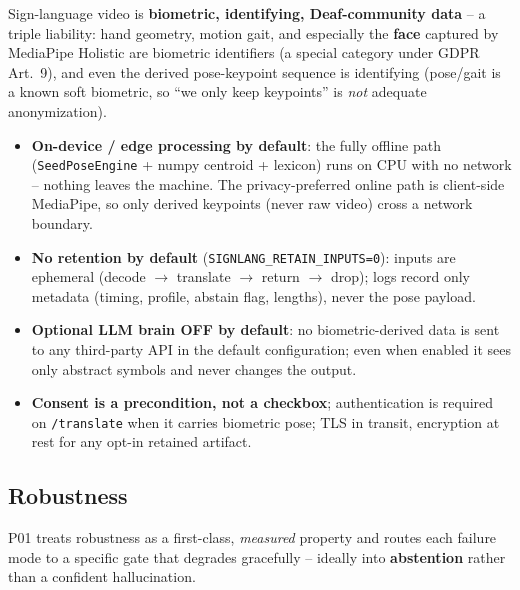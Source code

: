 \documentclass[12pt,a4paper]{article}
\begin{document}
Sign-language video is \textbf{biometric, identifying, Deaf-community data} -- a triple liability: hand geometry, motion gait, and especially the \textbf{face} captured by MediaPipe Holistic are biometric identifiers (a special category under GDPR Art.\ 9), and even the derived pose-keypoint sequence is identifying (pose/gait is a known soft biometric, so ``we only keep keypoints'' is \emph{not} adequate anonymization).
\begin{itemize}\setlength\itemsep{0.15em}
  \item \textbf{On-device / edge processing by default}: the fully offline path (\texttt{SeedPoseEngine} + numpy centroid + lexicon) runs on CPU with no network -- nothing leaves the machine. The privacy-preferred online path is client-side MediaPipe, so only derived keypoints (never raw video) cross a network boundary.
  \item \textbf{No retention by default} (\texttt{SIGNLANG\_RETAIN\_INPUTS=0}): inputs are ephemeral (decode $\rightarrow$ translate $\rightarrow$ return $\rightarrow$ drop); logs record only metadata (timing, profile, abstain flag, lengths), never the pose payload.
  \item \textbf{Optional LLM brain OFF by default}: no biometric-derived data is sent to any third-party API in the default configuration; even when enabled it sees only abstract symbols and never changes the output.
  \item \textbf{Consent is a precondition, not a checkbox}; authentication is required on \texttt{/translate} when it carries biometric pose; TLS in transit, encryption at rest for any opt-in retained artifact.
\end{itemize}

\subsection{Robustness}

P01 treats robustness as a first-class, \emph{measured} property and routes each failure mode to a specific gate that degrades gracefully -- ideally into \textbf{abstention} rather than a confident hallucination.
\end{document}
